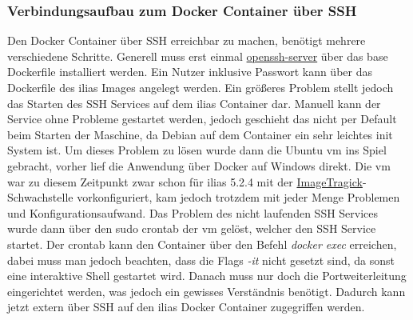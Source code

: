 \documentclass[10pt, a4paper,onecolumn ,titlepage]{article}
\begin{document}
    \subsubsection{Verbindungsaufbau zum Docker Container über SSH}
    \label{subsubsec:lessonslearnedDockerSSH}
    Den Docker Container über SSH erreichbar zu machen, benötigt mehrere verschiedene Schritte.
    Generell muss erst einmal \href{https://github.com/openssh}{openssh-server} über das base Dockerfile installiert werden.
    Ein Nutzer inklusive Passwort kann über das Dockerfile des \ac{ilias} Images angelegt werden.
    Ein größeres Problem stellt jedoch das Starten des SSH Services auf dem \ac{ilias} Container dar.
    Manuell kann der Service ohne Probleme gestartet werden, jedoch geschieht das nicht per Default beim Starten der Maschine, da Debian auf dem Container ein sehr leichtes init System ist.
    Um dieses Problem zu lösen wurde dann die Ubuntu \ac{vm} ins Spiel gebracht, vorher lief die Anwendung über Docker auf Windows direkt.
    Die \ac{vm} war zu diesem Zeitpunkt zwar schon für \ac{ilias} 5.2.4 mit der \hyperref[subsubsec:CVE-2016-3714]{ImageTragick}-Schwachstelle vorkonfiguriert, kam jedoch trotzdem mit jeder Menge Problemen und Konfigurationsaufwand.
    Das Problem des nicht laufenden SSH Services wurde dann über den sudo crontab der \ac{vm} gelöst, welcher den SSH Service startet.
    Der crontab kann den Container über den Befehl \textit{docker exec} erreichen, dabei muss man jedoch beachten, dass die Flags \textit{-it} nicht gesetzt sind, da sonst eine interaktive Shell gestartet wird.
    Danach muss nur doch die Portweiterleitung eingerichtet werden, was jedoch ein gewisses Verständnis benötigt.
    Dadurch kann jetzt extern über SSH auf den \ac{ilias} Docker Container zugegriffen werden.
\end{document}
